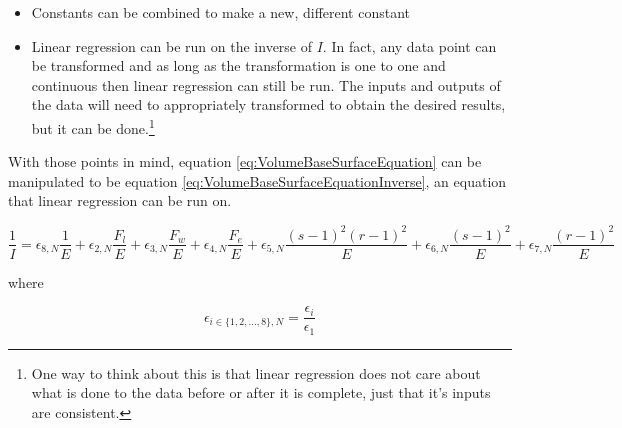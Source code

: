 \begin{itemize}
	\item Constants can be combined to make a new, different constant
	\item Linear regression can be run on the inverse of $I$. In fact, any data point can be transformed and as long as the transformation is one to one and continuous then linear regression can still be run. The inputs and outputs of the data will need to appropriately transformed to obtain the desired results, but it can be done.\footnote{One way to think about this is that linear regression does not care about what is done to the data before or after it is complete, just that it's inputs are consistent.}
\end{itemize}

With those points in mind, equation \ref{eq:VolumeBaseSurfaceEquation} can be manipulated to be equation \ref{eq:VolumeBaseSurfaceEquationInverse}, an equation that linear regression can be run on.

\begin{minipage}{\textwidth}
	\begin{equation}
		\frac{1}{I}=
			\epsilon_{8,N}\frac{1}{E}+
			\epsilon_{2,N}\frac{F_l}{E}+
			\epsilon_{3,N}\frac{F_w}{E}+
			\epsilon_{4,N}\frac{F_e}{E}+
			\epsilon_{5,N}\frac{(s-1)^2(r-1)^2}{E}+
			\epsilon_{6,N}\frac{(s-1)^2}{E}+
			\epsilon_{7,N}\frac{(r-1)^2}{E}
		\label{eq:VolumeBaseSurfaceEquationInverse}
	\end{equation}
	\centerline{where}
	\begin{equation*}
		\epsilon_{i\in\{1,2,...,8\},N}=\frac{\epsilon_i}{\epsilon_1}
	\end{equation*}
\end{minipage}

